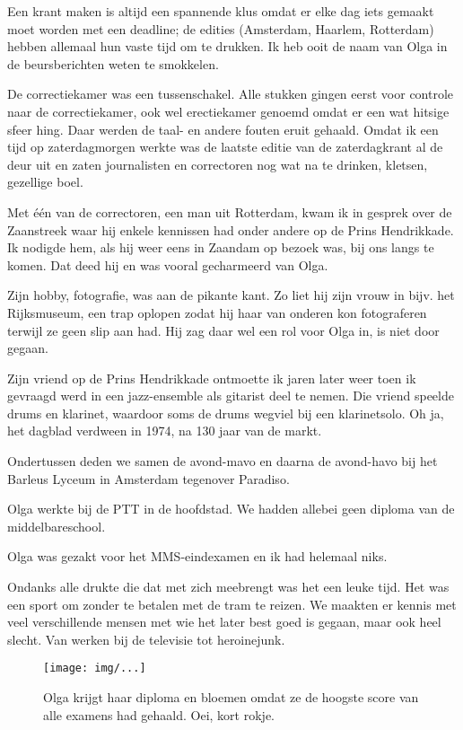 \documentclass[10pt,twoside,openright]{memoir}
\begin{document}
Een krant maken is altijd een spannende klus omdat er elke dag iets gemaakt moet worden met een deadline; de edities (Amsterdam, Haarlem, Rotterdam) hebben allemaal hun vaste tijd om te drukken. Ik heb ooit de naam van Olga in de beursberichten weten te smokkelen. 

De correctiekamer was een tussenschakel. Alle stukken gingen eerst voor controle naar de correctiekamer, ook wel erectiekamer genoemd omdat er een wat hitsige sfeer hing. Daar werden de taal- en andere fouten eruit gehaald. Omdat ik een tijd op zaterdagmorgen werkte was de laatste editie van de zaterdagkrant al de deur uit en zaten journalisten en correctoren nog wat na te drinken, kletsen, gezellige boel. 

Met één van de correctoren, een man uit Rotterdam, kwam ik in gesprek over de Zaanstreek waar hij enkele kennissen had onder andere op de Prins Hendrikkade. Ik nodigde hem, als hij weer eens in Zaandam op bezoek was, bij ons langs te komen. Dat deed hij en was vooral gecharmeerd van Olga. 

Zijn hobby, fotografie, was aan de pikante kant. Zo liet hij zijn vrouw in bijv. het Rijksmuseum, een trap oplopen zodat hij haar van onderen kon fotograferen terwijl ze geen slip aan had. Hij zag daar wel een rol voor Olga in, is niet door gegaan. 

Zijn vriend op de Prins Hendrikkade ontmoette ik jaren later weer toen ik gevraagd werd in een jazz-ensemble als gitarist deel te nemen. Die vriend speelde drums en klarinet, waardoor soms de drums wegviel bij een klarinetsolo. Oh ja, het dagblad verdween in 1974, na 130 jaar van de markt.

Ondertussen deden we samen de avond-mavo en daarna de avond-havo bij het Barleus Lyceum in Amsterdam tegenover Paradiso. 

Olga werkte bij de PTT in de hoofdstad. We hadden allebei geen diploma van de middelbareschool. 

Olga was gezakt voor het MMS-eindexamen en ik had helemaal niks.

Ondanks alle drukte die dat met zich meebrengt was het een leuke tijd. Het was een sport om zonder te betalen met de tram te reizen. We maakten er kennis met veel verschillende mensen met wie het later best goed is gegaan, maar ook heel slecht. Van werken bij de televisie tot heroinejunk. 

\begin{figure}[t]
\texttt{[image: img/...]}
\caption{Olga krijgt haar diploma en bloemen omdat ze de hoogste score van alle examens had gehaald. Oei, kort rokje.}
\end{figure}
\end{document}
